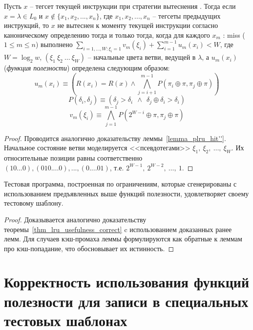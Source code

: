 \begin{lemma}\label{lemma_plru_hit'}
Пусть $x$ -- тегсет текущей инструкции при стратегии вытеснения
\PseudoLRU. Тогда если $x = \lambda \in L_0$ и $x \notin \{x_1, x_2,
..., x_n\}$, где $x_1, x_2, ..., x_n$ -- тегсеты предыдущих
инструкций, то $x$ не вытеснен к моменту текущей инструкции согласно
каноническому определению \PseudoLRU тогда и только тогда, когда для
каждого $x_m$ : miss ($1 \leqslant m \leqslant n$) выполнено
$\sum_{i=1,...,W:\xi_i = 1} v_m(\xi_i) + \sum^{m-1}_{i=1} u_m(x_i) <
W$, где $W = \log_2 w$, $(\xi_1~\xi_2~\dots~\xi_W)$ -- начальные
цвета ветви, ведущей в $\lambda$, а $u_m(x_i)$ (\emph{функция
полезности}) определена следующим образом:
$$u_m(x_i) \equiv
    (R(x_i) = R(x) \wedge \bigwedge_{j=i+1}^{m-1} P(\pi_i \oplus \pi,
       \pi_j \oplus \pi))$$
$$P(\delta_i, \delta_j) \equiv (\delta_j > \delta_i~~\wedge~~\delta_j \oplus \delta_i > \delta_i)$$
$$v_m(\xi_i) \equiv
    \bigwedge_{j=1}^{m-1} P(2^{W-i} \oplus \pi, \pi_j \oplus \pi)$$
\end{lemma}
\begin{proof}
  Проводится аналогично доказательству леммы~\ref{lemma_plru_hit''}.
  Начальное состояние ветви моделируется <<псевдотегами>>
  $\xi_1,~\xi_2,~\dots,~\xi_W$. Их относительные позиции равны
  соответственно $(1 0 ...0), (0 1 0 .... 0), ..., (0 .... 0 1)$,
  т.е. $2^{W-1},~2^{W-2},~\dots,~1$.
\end{proof}

\begin{theorem} Тестовая программа, построенная по ограничениям,
которые сгенерированы с использованием предъявленных выше функций
полезности, удовлетворяет своему тестовому шаблону.
\end{theorem}
\begin{proof}
  Доказывается аналогично доказательству
  теоремы~\ref{thm_lru_usefulness_correct} c использованием
  доказанных ранее лемм. Для случаев кэш-промаха леммы формулируются
  как обратные к леммам про кэш-попадание, что обосновывает их
  истинность.
\end{proof}


\section*{Корректность использования функций полезности для
записи \LRU в специальных тестовых шаблонах}

